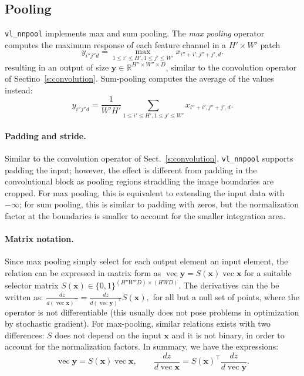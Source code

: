 \documentclass[12pt]{article}
\newcommand{\real}{\mathbb{R}}
\newcommand{\vv}{\operatorname{vec}}
\newcommand{\bx}{\mathbf{x}}
\newcommand{\by}{\mathbf{y}}
\begin{document}
\subsection{Pooling}\label{s:pooling}

\verb!vl_nnpool! implements max and sum pooling. The \emph{max pooling} operator computes the maximum response of each feature channel in a $H' \times W'$ patch
\[
y_{i''j''d} = \max_{1\leq i' \leq H', 1 \leq j' \leq W'} x_{i''+i',j''+j',d}.
\]
resulting in an output of size $\by\in\real^{H''\times W'' \times D}$, similar to the convolution operator of Sectino~\ref{s:convolution}. Sum-pooling computes the average of the values instead:
\[
y_{i''j''d} = \frac{1}{W'H'}
\sum_{1\leq i' \leq H', 1 \leq j' \leq W'} x_{i''+i',j''+j',d}.
\]

\paragraph{Padding and stride.} Similar to the convolution operator of Sect.~\ref{s:convolution}, \verb!vl_nnpool! supports padding the input; however, the effect is different from padding in the convolutional block as pooling regions straddling the image boundaries are cropped. For max pooling, this is equivalent to extending the input data with $-\infty$; for sum pooling, this is similar to padding with zeros, but the normalization factor at the boundaries is smaller to account for the smaller integration area.

\paragraph{Matrix notation.} Since max pooling simply select for each output element an input element, the relation can be expressed in matrix form as
$
    \vv\by = S(\bx) \vv \bx
$
for a suitable selector matrix $S(\bx)\in\{0,1\}^{(H''W''D) \times (HWD)}$. The derivatives can the be written as:
$
\frac{d z}{d (\vv \bx)^\top}
=
\frac{d z}{d (\vv \by)^\top}
S(\bx),
$
for all but a null set of points, where the operator is not differentiable (this usually does not pose problems in optimization by stochastic gradient). For max-pooling, similar relations exists with two differences: $S$ does not depend on the input $\bx$ and it is not binary, in order to account for the normalization factors. In summary, we have the expressions:
\begin{equation}\label{e:max-mat}
\boxed{
\vv\by = S(\bx) \vv \bx,
\qquad
\frac{d z}{d \vv \bx}
=
S(\bx)^\top
\frac{d z}{d \vv \by}.
}
\end{equation}
\end{document}
